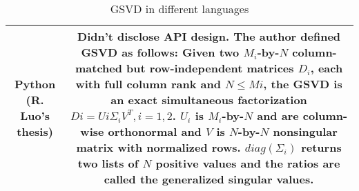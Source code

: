 \begin{table}[H]
\begin{tabular}{|c|c|}
            \\\hline
            Python (R. Luo's thesis) &  \makecell[l]{Didn't disclose API design. The author defined GSVD as follows: \\
            Given two $M_i$-by-$N$ column-matched but row-independent matrices $D_{i}$, \\ each with full column rank and $N \leq Mi$, the GSVD is an exact \\ simultaneous factorization $Di = Ui \Sigma_i V^T, i = 1, 2$. $U_i$ is $M_i$-by-$N$ and \\ are column-wise orthonormal and $V$ is $N$-by-$N$ nonsingular matrix with\\ normalized rows. $diag(\Sigma_i)$ returns two lists of $N$ positive values and \\the ratios are called the generalized singular values.} \\ \hline
        \end{tabular}
        \caption{GSVD in different languages}
        \label{tab:gsvdlang}
    \end{table}